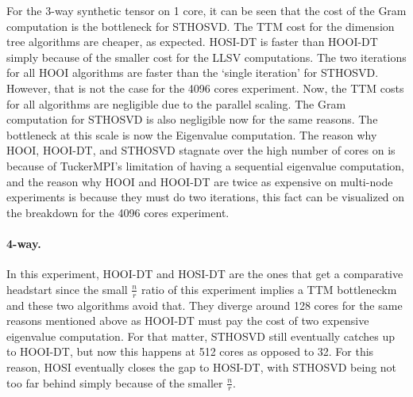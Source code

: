     For the 3-way synthetic tensor on 1 core, it can be seen that the cost of
    the Gram computation is the bottleneck for STHOSVD. The TTM cost for the
    dimension tree algorithms are cheaper, as expected. HOSI-DT is faster than
    HOOI-DT simply because of the smaller cost for the LLSV computations. The
    two iterations for all HOOI algorithms are faster than the `single
    iteration' for STHOSVD. However, that is not the case for the 4096 cores
    experiment. Now, the TTM costs for all algorithms are negligible due to the
    parallel scaling. The Gram computation for STHOSVD is also negligible now
    for the same reasons. The bottleneck at this scale is now the Eigenvalue
    computation. The reason why HOOI, HOOI-DT, and STHOSVD stagnate over the
    high number of cores on  is because of TuckerMPI's
    limitation of having a sequential eigenvalue computation, and the reason why
    HOOI and HOOI-DT are twice as expensive on multi-node experiments is because
    they must do two iterations, this fact can be visualized on the breakdown
    for the 4096 cores experiment.

    \paragraph{4-way.} In this experiment, HOOI-DT and HOSI-DT are the ones that
    get a comparative headstart since the small $\frac{n}{r}$ ratio of this
    experiment implies a TTM bottleneckm and these two algorithms avoid that.
    They diverge around 128 cores for the same reasons mentioned above as
    HOOI-DT must pay the cost of two expensive eigenvalue computation. For that
    matter, STHOSVD still eventually catches up to HOOI-DT, but now this
    happens at 512 cores as opposed to 32. For this reason, HOSI eventually
    closes the gap to HOSI-DT, with STHOSVD being not too far behind simply
    because of the smaller $\frac{n}{r}$.

